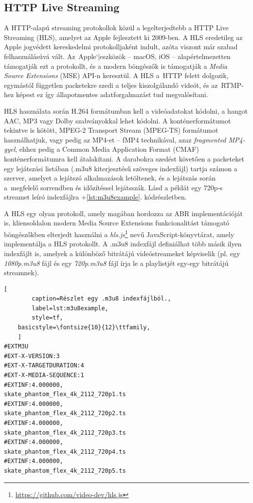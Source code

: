 \subsection{HTTP Live Streaming}

A HTTP-alapú streaming protokollok közül a legelterjedtebb a HTTP Live Streaming (HLS), amelyet az Apple fejlesztett ki 2009-ben. A HLS eredetileg az Apple jogvédett kereskedelmi protokolljaként indult, azóta viszont már szabad felhasználásúvá vált. Az~Apple`|eszközök -- macOS, iOS -- alapértelmezetten támogatják ezt a protokollt, és a modern böngészők is támogatják a \emph{Media Source Extensions} (MSE) API-n keresztül. A HLS a~HTTP felett dolgozik, egymástól független packetekre szedi a teljes kiszolgálandó videót, és az~RTMP-hez képest ez így állapotmentes adatforgalmazást tud megvalósítani.\cite{StreamingHistory}

HLS használata során H.264 formátumban kell a videóadatokat kódolni, a hangot AAC, MP3 vagy Dolby szabványokkal lehet kódolni. A konténerformátumot tekintve is kötött, MPEG-2 Transport Stream (MPEG-TS) formátumot használhatjuk, vagy pedig az MP4-et -- fMP4 technikával, azaz \emph{fragmented MP4-gyel}, ehhez pedig a Common Media Application Format (CMAF) konténerformátumra kell átalakítani.\cite{Cmaf} A darabokra szedést követően a packeteket egy lejátszási listában (.m3u8 kiterjesztésű szöveges indexfájl) tartja számon a szerver, amelyet a lejátszó alkalmazások letöltenek, és a lejátszás során a~megfelelő sorrendben és időzítéssel lejátsszák.\cite{HlsApple} Lásd a példát egy 720p-s streamet leíró indexfájlra \az+\ref{lst:m3u8example}. kódrészletben.

A HLS egy olyan protokoll, amely magában hordozza az ABR implementációját is, kliensoldalon modern Media Source Extensions funkcionalitást támogató böngészőkben elterjedt használni a \emph{hls.js}\footnote{\url{https://github.com/video-dev/hls.js}} nevű JavaScript-könyvtárat, amely implementálja a HLS protokollt. A .m3u8 indexfájl definiálhat több másik ilyen indexfájlt is, amelyek a különböző bitrátájú videóstreameket képviselik (pl. egy \emph{1080p.m3u8} fájl és egy \emph{720p.m3u8} fájl írja le a playlistjét egy-egy bitrátájú streamnek).

\begin{minipage}{0.92\textwidth}
	\begin{lstlisting}[
		caption=Részlet egy .m3u8 indexfájlból.,
		label=lst:m3u8example,
		style=tf,
    basicstyle=\fontsize{10}{12}\ttfamily,
	]
#EXTM3U
#EXT-X-VERSION:3
#EXT-X-TARGETDURATION:4
#EXT-X-MEDIA-SEQUENCE:1
#EXTINF:4.000000,
skate_phantom_flex_4k_2112_720p1.ts
#EXTINF:4.000000,
skate_phantom_flex_4k_2112_720p2.ts
#EXTINF:4.000000,
skate_phantom_flex_4k_2112_720p3.ts
#EXTINF:4.000000,
skate_phantom_flex_4k_2112_720p4.ts
#EXTINF:4.000000,
skate_phantom_flex_4k_2112_720p5.ts
\end{lstlisting}
\end{minipage}

